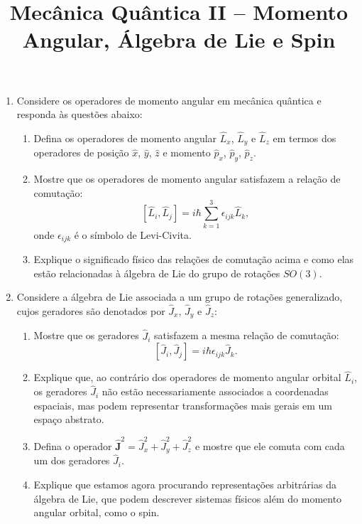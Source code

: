 \newif\ifuseseminar
\useseminartrue


\title{Mecânica Quântica II -- Momento Angular, Álgebra de Lie e Spin}


\begin{enumerate}
	\item Considere os operadores de momento angular em mecânica quântica e responda às
	      questões abaixo:
	      \begin{enumerate}
		      \item Defina os operadores de momento angular $\hat{L}_x$, $\hat{L}_y$
		            e $\hat{L}_z$ em termos dos operadores de posição $\hat{x}$,
		            $\hat{y}$, $\hat{z}$ e momento $\hat{p}_x$, $\hat{p}_y$,
		            $\hat{p}_z$.
		      \item Mostre que os operadores de momento angular satisfazem a relação de
		            comutação:
		            $$
			            [\hat{L}_i, \hat{L}_j] = i\hbar \sum_{k=1}^3\epsilon_{ijk} \hat{L}_k,
		            $$
		            onde $\epsilon_{ijk}$ é o símbolo de Levi-Civita.
		      \item Explique o significado físico das relações de comutação acima e como
		            elas estão relacionadas à álgebra de Lie do grupo de rotações
		            $SO(3)$.
	      \end{enumerate}

	\item Considere a álgebra de Lie associada a um grupo de rotações generalizado,
	      cujos geradores são denotados por $\hat{J}_x$, $\hat{J}_y$ e
	      $\hat{J}_z$:
	      \begin{enumerate}
		      \item Mostre que os geradores $\hat{J}_i$ satisfazem a mesma relação de
		            comutação:
		            $$
			            [\hat{J}_i, \hat{J}_j] = i\hbar \epsilon_{ijk} \hat{J}_k.
		            $$
		      \item Explique que, ao contrário dos operadores de momento angular orbital
		            $\hat{L}_i$, os geradores $\hat{J}_i$ não estão necessariamente
		            associados a coordenadas espaciais, mas podem representar
		            transformações mais gerais em um espaço abstrato.
		      \item Defina o operador $\hat{\mathbf{J}}^2 = \hat{J}_x^2 + \hat{J}_y^2 +
			            \hat{J}_z^2$ e mostre que ele comuta com cada um dos geradores
		            $\hat{J}_i$.
		      \item Explique que estamos agora procurando representações arbitrárias da
		            álgebra de Lie, que podem descrever sistemas físicos além do momento
		            angular orbital, como o spin.
	      \end{enumerate}


\end{enumerate}
